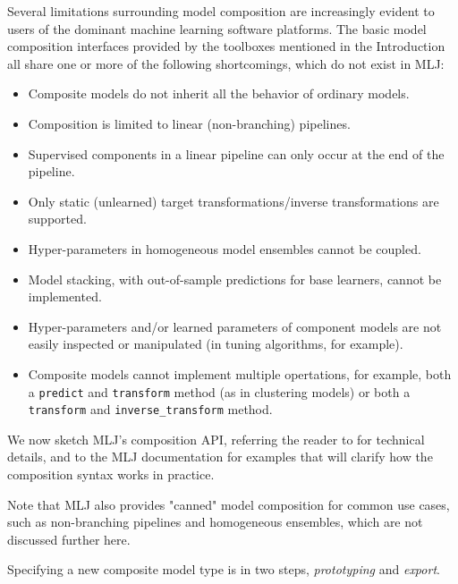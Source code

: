 \documentclass{article}
\begin{document}
Several limitations surrounding model composition are increasingly
evident to users of the dominant machine learning software
platforms. The basic model composition interfaces provided by the
toolboxes mentioned in the Introduction all share one or more of the
following shortcomings, which do not exist in MLJ:

\begin{itemize}

\item Composite models do not inherit all the behavior of ordinary
  models.

\item Composition is limited to linear (non-branching) pipelines.

\item Supervised components in a linear pipeline can only occur at the
  end of the pipeline.

\item Only static (unlearned) target transformations/inverse
  transformations are supported.

\item Hyper-parameters in homogeneous model ensembles cannot be
  coupled.

\item Model stacking, with out-of-sample predictions for base
  learners, cannot be implemented.

\item Hyper-parameters and/or learned parameters of component models
  are not easily inspected or manipulated (in tuning algorithms, for
  example).

\item Composite models cannot implement multiple opertations, for
  example, both a \texttt{predict} and \texttt{transform} method (as
  in clustering models) or both a \texttt{transform} and
  \texttt{inverse\_transform} method.

\end{itemize}

We now sketch MLJ's composition API, referring the reader to
\cite{Blaom_I} for technical details, and to the MLJ documentation
\cite{MLJdocs,MLJtutorials} for examples that will clarify how the
composition syntax works in practice.

Note that MLJ also provides "canned" model composition for common use
cases, such as non-branching pipelines and homogeneous ensembles,
which are not discussed further here.

Specifying a new composite model type is in two steps,
\textit{prototyping} and \textit{export}.
\end{document}
